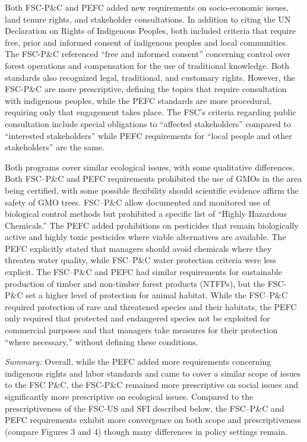 \documentclass[
      12pt,
            Review ]{article}
\begin{document}
Both FSC-P\&C and PEFC added new requirements on socio-economic issues,
land tenure rights, and stakeholder consultations. In addition to citing
the UN Declaration on Rights of Indigenous Peoples, both included
criteria that require free, prior and informed consent of indigenous
peoples and local communities. The FSC-P\&C referenced ``free and
informed consent'' concerning control over forest operations and
compensation for the use of traditional knowledge. Both standards also
recognized legal, traditional, and customary rights. However, the
FSC-P\&C are more prescriptive, defining the topics that require
consultation with indigenous peoples, while the PEFC standards are more
procedural, requiring only that engagement takes place. The FSC's
criteria regarding public consultation include special obligations to
``affected stakeholders'' compared to ``interested stakeholders'' while
PEFC requirements for ``local people and other stakeholders'' are the
same.

Both programs cover similar ecological issues, with some qualitative
differences. Both FSC--P\&C and PEFC requirements prohibited the use of
GMOs in the area being certified, with some possible flexibility should
scientific evidence affirm the safety of GMO trees. FSC--P\&C allow
documented and monitored use of biological control methods but
prohibited a specific list of ``Highly Hazardous Chemicals.'' The PEFC
added prohibitions on pesticides that remain biologically active and
highly toxic pesticides where viable alternatives are available. The
PEFC explicitly stated that managers should avoid chemicals where they
threaten water quality, while FSC--P\&C water protection criteria were
less explicit. The FSC--P\&C and PEFC had similar requirements for
sustainable production of timber and non-timber forest products (NTFPs),
but the FSC-P\&C set a higher level of protection for animal habitat.
While the FSC--P\&C required protection of rare and threatened species
and their habitats, the PEFC only required that protected and endangered
species not be exploited for commercial purposes and that managers take
measures for their protection ``where necessary,'' without defining
these conditions.

\emph{Summary:} Overall, while the PEFC added more requirements
concerning indigenous rights and labor standards and came to cover a
similar scope of issues to the FSC P\&C, the FSC-P\&C remained more
prescriptive on social issues and significantly more prescriptive on
ecological issues. Compared to the prescriptiveness of the FSC-US and
SFI described below, the FSC--P\&C and PEFC requirements exhibit more
convergence on both scope and prescriptiveness (compare Figures 3 and 4)
though many differences in policy settings remain.
\end{document}
